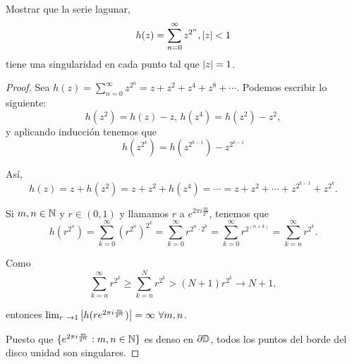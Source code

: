 \begin{example}
    Mostrar que la serie lagunar,
    \begin{equation*}
        h(z) = \sum_{n=0}^{\infty}  z^{2^n}, \left\lvert z\right\rvert < 1
    \end{equation*}
 tiene una singularidad en cada punto tal que $\left\lvert z\right\rvert = 1$.
\end{example}

\begin{proof}
     Sea $h(z) = \sum_{n=0}^{\infty} z^{2^n} = z + z^2 + z^4 + z^8 + \cdots$. Podemos escribir lo siguiente:
    \begin{equation*}
         h(z^2) = h(z) - z, \,
         h(z^4) = h(z^2) - z^2,
    \end{equation*}
    y aplicando inducción tenemos que 
    \begin{equation*}
        h(z^{2^k}) = h(z^{2^{k-1}}) - z^{2^{k-1}}
    \end{equation*}

    Así,
    \begin{equation*}
        h(z) = z + h(z^2) = z + z^2 + h(z^4) = \cdots = z + z^2 + \cdots + z^{2^{k-1}} + z^{2^k}.
    \end{equation*}

    Si $m, n \in \mathbb{N}$ y $r \in (0,1)$ y llamamos $r$ a $e^{2 \pi i \frac{m}{2^n}}$, tenemos que
    \begin{equation*}
        h(r^{2^n}) = \sum_{k=0}^{\infty} (r^{2^n})^{2^k} = \sum_{k=0}^{\infty} r^{2^n \cdot 2^k} = \sum_{k=0}^{\infty} r^{2^{(n+k)}} =  \sum_{k=n}^{\infty} r^{2^k}.
    \end{equation*}

    Como
    \begin{equation*}
        \sum_{k=n}^{\infty} r^{2^k} \geq \sum_{k=n}^{N} r^{2^k} > (N + 1) r^{2^k} \rightarrow N + 1,
    \end{equation*}
    
    entonces $\lim_{r \rightarrow 1} \abs{h(re^{2 \pi i \frac{m}{2^n}})} = \infty \, \, \forall m, n$. \\ \par

    Puesto que $\{e^{2 \pi i \frac{m}{2^n}} : m, n \in \mathbb{N}\}$ es denso en $\partial \mathbb{D}$, todos los puntos del borde del disco unidad son singulares.
\end{proof}
